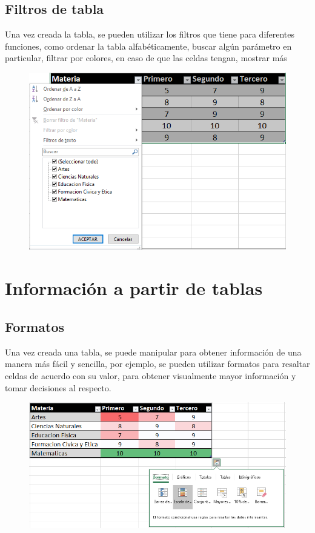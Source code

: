 \documentclass[12pt,a4paper]{book}
\begin{document}
\section{Filtros de tabla}
Una vez creada la tabla, se pueden utilizar los filtros que tiene para diferentes funciones, como ordenar la tabla alfabéticamente, buscar algún parámetro en particular, filtrar por colores, en caso de que las celdas tengan, mostrar más 
\\
\begin{figure}[h]
	\centering
    \includegraphics[width=16cm]{excel9}
\end{figure}

\chapter{Información a partir de tablas}
\section{Formatos}
Una vez creada una tabla, se puede manipular para obtener información de una manera más fácil y sencilla, por ejemplo, se pueden utilizar formatos para resaltar celdas de acuerdo con su valor, para obtener visualmente mayor información y tomar decisiones al respecto.
\begin{figure}[h]
	\centering
    \includegraphics[width=16cm]{excel10}
\end{figure}
\clearpage
\end{document}
